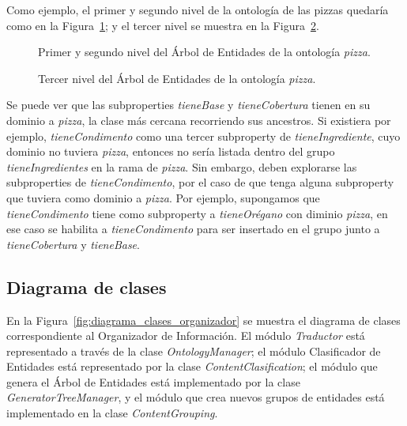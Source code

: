 Como ejemplo, el primer y segundo nivel de la ontología de las pizzas quedaría como en la Figura~\ref{fig:macro_planning_pizza}; y el tercer nivel se muestra en la Figura~\ref{fig:macro_planning_pizza_n2}.

\begin{figure}
\centering
\begin{minipage}[c]{0.7\textwidth}
{\footnotesize 
{}}
\caption{Primer y segundo nivel del Árbol de Entidades de la ontología \emph{pizza}.}
\label{fig:macro_planning_pizza}
\end{minipage}
\end{figure}

\begin{figure}
\centering
\begin{minipage}[c]{0.7\textwidth}
{\footnotesize 
{}}
\caption{Tercer nivel del Árbol de Entidades de la ontología \emph{pizza}.}
\label{fig:macro_planning_pizza_n2}
\end{minipage}
\end{figure}


Se puede ver que las subproperties \emph{tieneBase} y \emph{tieneCobertura} tienen en su dominio a \emph{pizza}, la clase más cercana recorriendo sus ancestros. Si existiera por ejemplo, \emph{tieneCondimento} como una tercer subproperty de \emph{tieneIngrediente}, cuyo dominio no tuviera \emph{pizza}, entonces no sería listada dentro del grupo \emph{tieneIngredientes} en la rama de \emph{pizza}. Sin embargo, deben explorarse las subproperties de \emph{tieneCondimento}, por el caso de que tenga alguna subproperty que tuviera como dominio a \emph{pizza}. Por ejemplo, supongamos que \emph{tieneCondimento} tiene como subproperty a \emph{tieneOrégano} con diminio \emph{pizza}, en ese caso se habilita a \emph{tieneCondimento} para ser insertado en el grupo junto a  \emph{tieneCobertura} y \emph{tieneBase}. 

\subsection{Diagrama de clases}
En la Figura~\ref{fig:diagrama_clases_organizador} se muestra el diagrama de clases correspondiente al Organizador de Información. El módulo \emph{Traductor} está representado a través de la clase \emph{OntologyManager}; el módulo Clasificador de Entidades está representado por la clase \emph{ContentClasification}; el módulo que genera el Árbol de Entidades está implementado por la clase \emph{GeneratorTreeManager}, y el módulo que crea nuevos grupos de entidades está implementado en la clase \emph{ContentGrouping}. 


